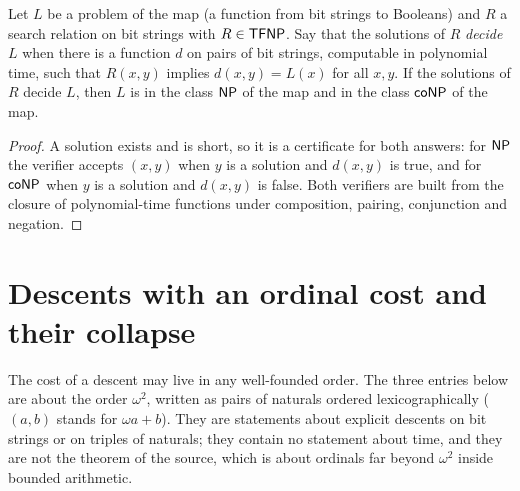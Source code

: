 \begin{theorem}
  \label{thm:search-np-conp-tfnp}
  \leanok
  Let $L$ be a problem of the map (a function from bit strings to Booleans) and $R$ a search
  relation on bit strings with $R \in \mathsf{TFNP}$. Say that the solutions of $R$ \emph{decide} $L$
  when there is a function $d$ on pairs of bit strings, computable in polynomial time, such that
  $R(x, y)$ implies $d(x, y) = L(x)$ for all $x, y$. If the solutions of $R$ decide $L$, then $L$
  is in the class $\mathsf{NP}$ of the map and in the class $\mathsf{coNP}$ of the map.
\end{theorem}

\begin{proof}
  \leanok
  A solution exists and is short, so it is a certificate for both answers: for $\mathsf{NP}$ the verifier
  accepts $(x, y)$ when $y$ is a solution and $d(x, y)$ is true, and for $\mathsf{coNP}$ when $y$ is a
  solution and $d(x, y)$ is false. Both verifiers are built from the closure of polynomial-time
  functions under composition, pairing, conjunction and negation.
\end{proof}

\section{Descents with an ordinal cost and their collapse}
\label{sec:search-ordinal-descent}

The cost of a descent may live in any well-founded order. The three entries below are about the
order $\omega^2$, written as pairs of naturals ordered lexicographically ($(a, b)$ stands for
$\omega a + b$). They are statements about explicit descents on bit strings or on triples of
naturals; they contain no statement about time, and they are not the theorem of the source, which
is about ordinals far beyond $\omega^2$ inside bounded arithmetic.

